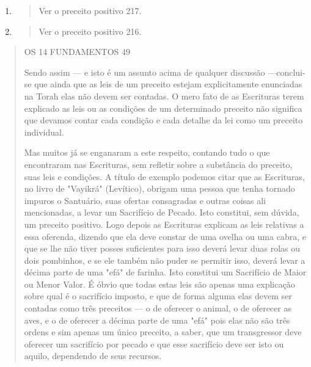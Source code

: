 \begin{enumerate}
\def\labelenumi{\arabic{enumi}.}
\setcounter{enumi}{6}
\item
  \begin{quote}
  Ver o preceito positivo 217.
  \end{quote}
\item
  \begin{quote}
  Ver o preceito positivo 216.
  \end{quote}
\end{enumerate}

\begin{quote}
OS 14 FUNDAMENTOS 49

Sendo assim --- e isto é um assunto acima de qualquer discussão
---conclui-se que ainda que as leis de um preceito estejam
explicitamente enun­ciadas na Torah elas não devem ser contadas. O mero
fato de as Escrituras te­rem explicado as leis ou as condições de um
determinado preceito não signifi­ca que devamos contar cada condição e
cada detalhe da lei como um preceito individual.

Mas muitos já se enganaram a este respeito, contando tudo o que
encontraram nas Escrituras, sem refletir sobre a substância do preceito,
suas leis e condições. A título de exemplo podemos citar que as
Escrituras, no livro de "Vayikrá" (Levítico), obrigam uma pessoa que
tenha tornado impuros o San­tuário, suas ofertas consagradas e outras
coisas ali mencionadas, a levar um Sa­crifício de Pecado. Isto
constitui, sem dúvida, um preceito positivo. Logo de­pois as Escrituras
explicam as leis relativas a essa oferenda, dizendo que ela de­ve
constar de uma ovelha ou uma cabra, e que se lhe não tiver posses
suficien­tes para isso deverá levar duas rolas ou dois pombinhos, e se
ele também não puder se permitir isso, deverá levar a décima parte de
uma "efá" de farinha. Isto constitui um Sacrifício de Maior ou Menor
Valor. É óbvio que todas estas leis são apenas uma explicação sobre qual
é o sacrifício imposto, e que de for­ma alguma elas devem ser contadas
como três preceitos --- o de oferecer o ani­mal, o de oferecer as aves,
e o de oferecer a décima parte de uma "efá" pois elas não são três
ordens e sim apenas um único preceito, a saber, que um transgressor deve
oferecer um sacrifício por pecado e que esse sacrifício deve ser isto ou
aquilo, dependendo de seus recursos.


\end{quote}
